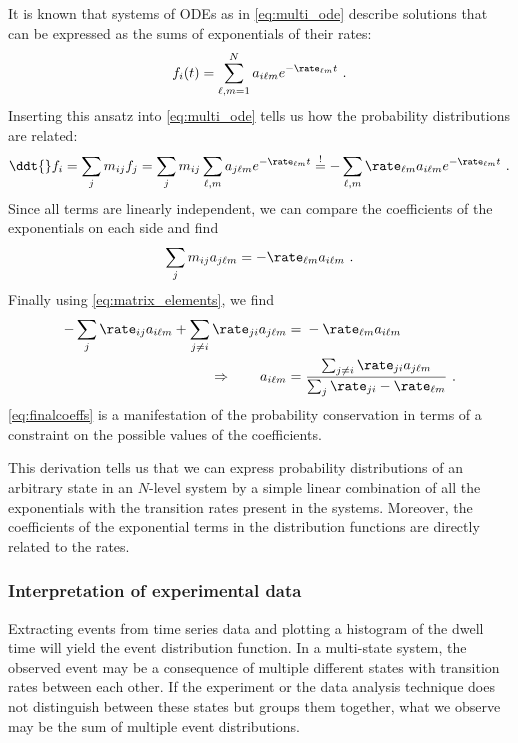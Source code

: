 It is known that systems of ODEs as in \cref{eq:multi_ode} describe solutions that can be expressed as the
sums of exponentials of their rates:
%
\begin{align}\label{eq:ansatz}
    f_i(t)  = \sum_{\ell, m=1}^N a_{i\ell m} e^{- \rate_{\ell m} t}
    \text{ .}
\end{align}
%
Inserting this ansatz into \cref{eq:multi_ode} tells us how the probability distributions are related:
%
\begin{align*}
    \ddt{} f_i = \sum_{j} m_{ij} f_j
               = \sum_{j} m_{ij} \sum_{\ell, m} a_{j\ell m} e^{- \rate_{\ell m} t}
    \overset{!}{=} - \sum_{\ell, m} \rate_{\ell m} a_{i\ell m} e^{- \rate_{\ell m} t}
    \text{ .}
\end{align*}
%
Since all terms are linearly independent, we can compare the coefficients of the exponentials on each side and
find
%
\begin{align}\label{eq:coeffeq}
    \sum_j m_{ij} a_{j\ell m} = - \rate_{\ell m} a_{i\ell m}
    \text{ .}
\end{align}
%
Finally using \cref{eq:matrix_elements}, we find
%
\begin{align}\label{eq:finalcoeffs}
    -\sum_j \rate_{ij} a_{i\ell m} + \sum_{j\ne i} \rate_{ji} a_{j\ell m}
    ={}& - \rate_{\ell m} a_{i\ell m} \nonumber\\
    \Rightarrow\qquad  a_{i\ell m}
    ={}& \frac{\sum_{j\ne i} \rate_{ji} a_{j\ell m}}{\sum_j \rate_{ji} - \rate_{\ell m} }
    \text{ .}
\end{align}
%
\cref{eq:finalcoeffs} is a manifestation of the probability conservation in terms of a constraint on the
possible values of the coefficients.

This derivation tells us that we can express probability distributions of an arbitrary state in an $N$-level
system by a simple linear combination of all the exponentials with the transition rates present in the
systems. Moreover, the coefficients of the exponential terms in the distribution functions are directly
related to the rates.


\subsubsection{Interpretation of experimental data}

Extracting events from time series data and plotting a histogram of the dwell time will yield the event
distribution function. In a multi-state system, the observed event may be a consequence of multiple different
states with transition rates between each other. If the experiment or the data analysis technique does not
distinguish between these states but groups them together, what we observe may be the sum of multiple event
distributions.

